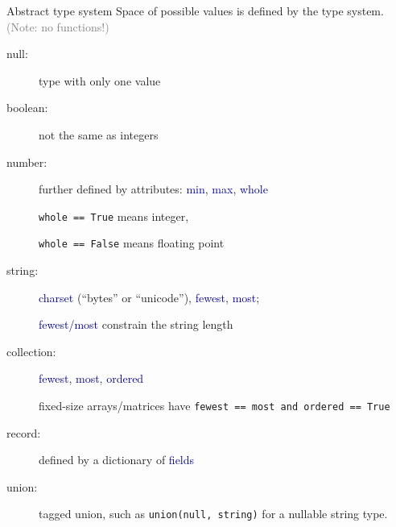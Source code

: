 \documentclass{beamer}
\begin{document}
\begin{frame}{Abstract type system}
\vspace{0.5 cm}
Space of possible values is defined by the type system. \\ \textcolor{gray}{(Note: no functions!)}

\begin{description}
\item[null:] type with only one value
\item[boolean:] not the same as integers
\item[number:] further defined by attributes: \textcolor{darkblue}{min}, \textcolor{darkblue}{max}, \textcolor{darkblue}{whole}

{\tt whole == True} means integer,

{\tt whole == False} means floating point

\item[string:] \textcolor{darkblue}{charset} (``bytes'' or ``unicode''), \textcolor{darkblue}{fewest}, \textcolor{darkblue}{most};

\textcolor{darkblue}{fewest/most} constrain the string length

\item[collection:] \textcolor{darkblue}{fewest}, \textcolor{darkblue}{most}, \textcolor{darkblue}{ordered}

fixed-size arrays/matrices have {\tt fewest == most and ordered == True}

\item[record:] defined by a dictionary of \textcolor{darkblue}{fields}
\item[union:] tagged union, such as {\tt union(null, string)} for a nullable string type.
\end{description}
\end{frame}
\end{document}

